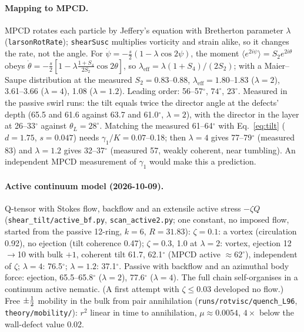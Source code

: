 \paragraph{Mapping to MPCD.} MPCD rotates each particle by Jeffery's equation with Bretherton parameter $\lambda$ (\texttt{larsonRotRate}); \texttt{shearSusc} multiplies vorticity
and strain alike, so it changes the rate, not the angle. For $\dot\psi=-\frac s2(1-\lambda\cos2\psi)$, the moment $\langle e^{2i\psi}\rangle=S_2e^{2i\theta}$ obeys
$\dot\theta=-\frac s2\left[1-\lambda\frac{1+S_4}{2S_2}\cos2\theta\right]$, so $\lambda_\mathrm{eff}=\lambda(1+S_4)/(2S_2)$; with a Maier--Saupe distribution at the measured
$S_2=0.83$--0.88, $\lambda_\mathrm{eff}=1.80$--1.83 ($\lambda=2$), 3.61--3.66 ($\lambda=4$), 1.08 ($\lambda=1.2$). Leading order: 56--57$^\circ$, $74^\circ$, $23^\circ$.
Measured in the passive swirl runs: the tilt equals twice the director angle at the defects' depth (65.5 and 61.6 against 63.7 and 61.0$^\circ$, $\lambda=2$), with the director in the layer
at 26--33$^\circ$ against $\theta_L=28^\circ$. Matching the measured 61--64$^\circ$ with Eq.~\eqref{eq:tilt} ($d=1.75$, $s=0.047$) needs $\gamma_1/K=0.07$--0.18; then $\lambda=4$ gives
77--79$^\circ$ (measured 83) and $\lambda=1.2$ gives 32--37$^\circ$ (measured 57, weakly coherent, near tumbling). An independent MPCD measurement of $\gamma_1$ would make this a prediction.
\paragraph{Active continuum model (2026-10-09).} Q-tensor with Stokes flow, backflow and an extensile active stress $-\zeta Q$ (\texttt{shear\_tilt/active\_bf.py},
\texttt{scan\_active2.py}; one constant, no imposed flow, started from the passive 12-ring, $k=6$, $R=31.83$): $\zeta=0.1$: a vortex (circulation 0.92), no ejection (tilt coherence
0.47); $\zeta=0.3$, 1.0 at $\lambda=2$: vortex, ejection 12$\to$10 with bulk $+1$, coherent tilt 61.7, 62.1$^\circ$ (MPCD active $\approx62^\circ$), independent of $\zeta$; $\lambda=4$:
76.5$^\circ$; $\lambda=1.2$: 37.1$^\circ$. Passive with backflow and an azimuthal body force: ejection, 65.5--65.8$^\circ$ ($\lambda=2$), 77.6$^\circ$ ($\lambda=4$). The full chain
self-organises in a continuum active nematic. (A first attempt with $\zeta\le0.03$ developed no flow.) Free $\pm\tfrac12$ mobility in the bulk from pair annihilation
(\texttt{runs/rotvisc/quench\_L96}, \texttt{theory/mobility/}): $r^2$ linear in time to annihilation, $\mu\approx0.0054$, $4\times$ below the wall-defect value 0.02.

